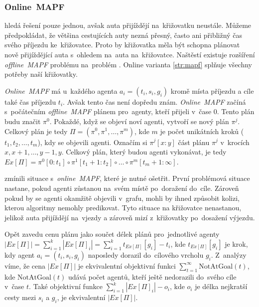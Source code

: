 \subsubsection{Online~MAPF}\label{subsubsec:online_mapf}

%

 hledá řešení pouze jednou, avšak auta přijíždějí na~křižovatku neustále.
Můžeme předpokládat, že většina cestujících auty nezná přesný, často ani přibližný čas svého příjezdu ke~křižovatce.
Proto by křižovatka měla být schopna plánovat nově přijíždějící auta s~ohledem na~auta na~křižovatce.
Naštěstí existuje rozšíření \emph{offline~MAPF} problému na~problém  \citep*{Svancara}.
Online varianta \ref{str:mapf} splňuje všechny potřeby naší křižovatky.

\emph{Online~MAPF} má u~každého agenta $a_i = (t_i, s_i, g_i)$ kromě místa příjezdu a cíle také čas příjezdu $t_i$.
Avšak tento čas není dopředu znám.
\emph{Online~MAPF} začíná s~počátečním \emph{offline~MAPF} plánem pro~agenty, kteří přijeli v~čase $0$.
Tento plán budu značit $\pi^0$.
Pokaždé, když se objeví noví agenti, vytvoří se nový plán $\pi^j$.
Celkový plán je tedy $\Pi = (\pi^0, \pi^1, \dots, \pi^m)$, kde $m$ je počet unikátních kroků ($t_1, t_2, \dots, t_m$), kdy se objevili agenti.
Označím si $\pi^j[x:y]$ část plánu $\pi^j$ v~krocích $x, x + 1, \dots, y - 1, y$.
Celkový plán, který budou agenti vykonávat, je tedy $Ex[\Pi] = \pi^0[0:t_1] \circ \pi^1[t_1 + 1:t_2] \circ \dots \circ \pi^m[t_m + 1:\infty]$.

\citet{Svancara} zmínili situace s~\emph{online~MAPF}, které je nutné ošetřit.
První problémová situace nastane, pokud agenti zůstanou na~svém místě po~doražení do~cíle.
Zároveň pokud by se agenti okamžitě objevili v~grafu, mohli by ihned způsobit kolizi, kterou algoritmy nemohly predikovat.
Tyto situace na křižovatce nenastanou, jelikož auta přijíždějí na~vjezdy
a zároveň mizí z~křižovatky po~dosažení výjezdu.

Opět zavedu cenu plánu jako součet délek plánů pro~jednotlivé agenty $|Ex[\Pi]| = \sum_{i=1}^{k} |Ex[\Pi]_i| = \sum_{i=1}^{k} t_{Ex[\Pi]}[g_i] - t_i$,
kde $t_{Ex[\Pi]}[g_i]$ je krok, kdy agent $a_i = (t_i, s_i, g_i)$ naposledy dorazil do~cílového vrcholu $g_i$.
Z~analýzy \citet{Svancara} víme, že cena $|Ex[\Pi]|$ je ekvivalentní objektivní funkci $\sum_{t=1}^{\infty} \textrm{NotAtGoal}(t)$,
kde $\textrm{NotAtGoal}(t)$ udává počet agentů, kteří ještě nedorazili do~svého cíle v~čase $t$.
Také objektivní funkce $\sum_{i=1}^{k} |Ex[\Pi]_i| - o_i$, kde $o_i$ je délka nejkratší cesty mezi $s_i$ a $g_i$,
je ekvivalentní $|Ex[\Pi]|$.

